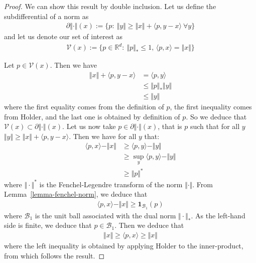 \begin{proof}
We can show this result by double inclusion. Let us define the subdifferential of a norm as
\begin{align*}
    \partial\Vert \cdot\Vert(x):=\{p:~\Vert y\Vert \geq \Vert x \Vert + \langle p, y-x\rangle~\forall y\}
\end{align*}
and let us denote our set of interest as
\begin{align*}
    \mathcal{V}(x):=\{p\in\mathbb{R}^d:~\Vert p\Vert_*\leq 1\text{, } \langle p, x\rangle = \Vert x\Vert\}
\end{align*}

Let $p\in\mathcal{V}(x)$. Then we have
\begin{align*}
    \Vert x \Vert + \langle p, y-x\rangle &= \langle p, y\rangle \\
    &\leq \Vert p\Vert_* \Vert y\Vert\\
    &\leq \Vert y\Vert
\end{align*}
where the first equality comes from the definition of $p$, the first inequality comes from Holder, and the last one is obtained by definition of $p$. So we deduce that $\mathcal{V}(x)\subset  \partial\Vert \cdot\Vert(x)$.
Let us now take $p\in \partial\Vert \cdot\Vert(x)$, that is $p$ such that for all $y$ 
$\Vert y\Vert \geq \Vert x \Vert + \langle p, y-x\rangle$. Then we have for all $y$ that:
\begin{align*}
    \langle p,x\rangle - \Vert x\Vert &\geq \langle p,y\rangle 
 - \Vert y\Vert\\
 & \geq \sup_y\langle p,y\rangle 
 - \Vert y\Vert\\
 &\geq \Vert p\Vert^{*}
\end{align*}
where $\Vert \cdot\Vert^{*}$ is the Fenchel-Legendre transform of the norm $\Vert\cdot \Vert$. From Lemma~\ref{lemma-fenchel-norm}, we deduce that
\begin{align*}
    \langle p,x\rangle - \Vert x\Vert \geq \bm{1}_{\mathcal{B}_{1}}(p)
\end{align*}
where $\mathcal{B}_{1}$ is the unit ball associated with the dual norm $\Vert \cdot\Vert_{*}$. As the left-hand side is finite, we deduce that $p\in\mathcal{B}_1$. Then we deduce that 
\begin{align*}
   \Vert x\Vert \geq  \langle p, x\rangle \geq \Vert x\Vert
\end{align*}
where the left inequality is obtained by applying Holder to the inner-product, from which follows the result.

\end{proof}

